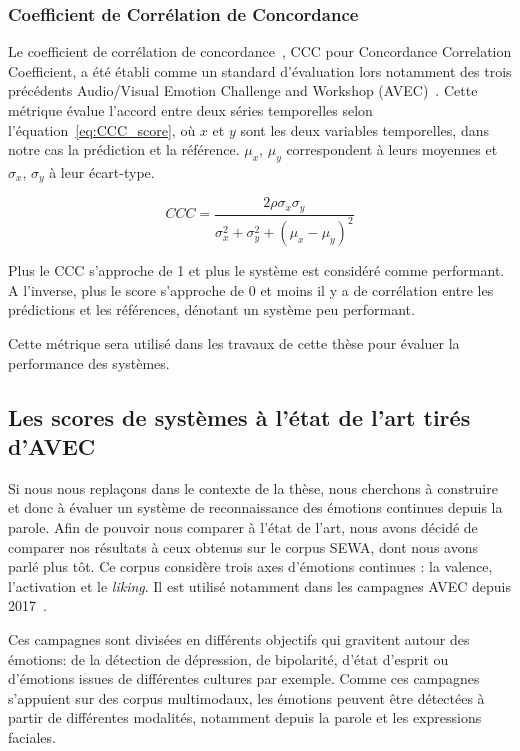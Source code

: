 \subsubsection{Coefficient de Corrélation de Concordance}
Le coefficient de corrélation de concordance~\cite{CCC}, CCC pour Concordance Correlation Coefficient, a été établi comme un standard d'évaluation lors notamment des trois précédents Audio/Visual Emotion Challenge and Workshop (AVEC)~\cite{AVEC2017,AVEC2018,AVEC2019}. Cette métrique évalue l'accord entre deux séries temporelles selon l'équation~\ref{eq:CCC_score}, où $x$ et $y$ sont les deux variables temporelles, dans notre cas la prédiction et la référence. $\mu_x$, $\mu_y$ correspondent à leurs moyennes et $\sigma_x$, $\sigma_y$ à leur écart-type.

 \begin{equation}
    CCC = \frac{2\rho\sigma_x\sigma_y}{\sigma_x^2 + \sigma_y^2 + (\mu_x - \mu_y)^2}
 \label{eq:CCC_score}
 \end{equation}

Plus le CCC s'approche de 1 et plus le système est considéré comme performant. A l'inverse, plus le score s'approche de 0 et moins il y a de corrélation entre les prédictions et les références, dénotant un système peu performant.

Cette métrique sera utilisé dans les travaux de cette thèse pour évaluer la performance des systèmes.

\subsection{Les scores de systèmes à l'état de l'art tirés d'AVEC}


Si nous nous replaçons dans le contexte de la thèse, nous cherchons à construire et donc à évaluer un système de reconnaissance des émotions continues depuis la parole. Afin de pouvoir nous comparer à l'état de l'art, nous avons décidé de comparer nos résultats à ceux obtenus sur le corpus SEWA, dont nous avons parlé plus tôt.
Ce corpus considère trois axes d'émotions continues : la valence, l'activation et le \textit{liking}. Il est utilisé notamment dans les campagnes AVEC depuis 2017~\cite{AVEC2017,AVEC2018,AVEC2019}.

Ces campagnes sont divisées en différents objectifs qui gravitent autour des émotions: de la détection de dépression, de bipolarité, d'état d'esprit ou d'émotions issues de différentes cultures par exemple. Comme ces campagnes s'appuient sur des corpus multimodaux, les émotions peuvent être détectées à partir de différentes modalités, notamment depuis la parole et les expressions faciales.

